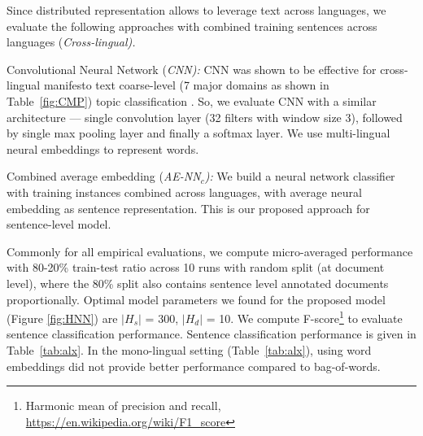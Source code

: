 \documentclass[11pt,a4paper]{article}
\newcommand{\tabref}[2][]{Table#1~\ref{#2}\xspace}
\newcommand{\norm}[1]{\vert #1 \vert}
\begin{document}
Since distributed representation allows to leverage text across languages, we evaluate the following approaches with combined training sentences across languages (\em{Cross-lingual}). \rm

\begin{description}
\item{Convolutional Neural Network (\em{CNN}):} CNN was shown to be effective for cross-lingual manifesto text coarse-level (7 major domains as shown in \tabref{fig:CMP}) topic classification \cite{W17-2906}. So, we evaluate CNN with a similar architecture --- single convolution layer (32 filters with window size 3), followed by single max pooling layer and finally a softmax layer. We use multi-lingual neural embeddings to represent words.
\item{Combined average embedding (\em{AE-NN$_{c}$}):} We build a neural network classifier with training instances combined across languages, with average neural embedding as sentence representation. This is our proposed approach for sentence-level model.
\end{description}

Commonly for all empirical evaluations, we compute micro-averaged performance with 80-20\% train-test ratio across 10 runs with random split (at document level), where the 80\% split also contains sentence level annotated documents proportionally. Optimal model parameters we found for the proposed model (Figure \ref{fig:HNN}) are $\norm{H_{s}}$ = 300, $\norm{H_{d}}$ = 10. We compute F-score\footnote{Harmonic mean of precision and recall, \url{https://en.wikipedia.org/wiki/F1_score}} to evaluate sentence classification performance. Sentence classification performance is given in \tabref{tab:alx}. In the mono-lingual setting (\tabref{tab:alx}), using word embeddings did not provide better performance compared to bag-of-words. 
\end{document}
